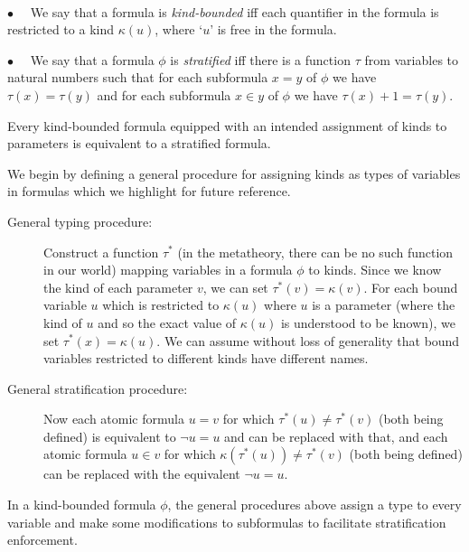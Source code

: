 \documentclass[12pt]{article}
\begin{document}
\begin{dfn} \mbox{}\\
  $\bullet$ \mbox{\, }
  We say that a formula is {\em kind-bounded\/} iff each quantifier in the formula is restricted to a kind $\kappa(u)$, where `$u$' is free in the formula.
  
$\bullet$ \mbox{\, }  We say that a formula $\phi$ is {\em stratified\/} iff there is a function $\tau$ from variables to natural numbers such that for each subformula  $x=y$ of $\phi$ we have $\tau(x)=\tau(y)$ and for each subformula $x \in y$ of $\phi$ we have $\tau(x)+1 = \tau(y)$.\end{dfn}

\begin{thm} Every kind-bounded formula equipped with an intended assignment of kinds to parameters is equivalent to a stratified formula. \end{thm}

\Proof

We begin by defining a general procedure for assigning kinds as types of variables in formulas which we highlight for future reference.

\begin{description}

\item [General typing procedure:]  Construct a function $\tau^*$ (in the metatheory, there can be no such function in our world) mapping variables in a formula $\phi$ to kinds.  Since we know the kind of each parameter $v$, we can set $\tau^*(v) = \kappa(v)$.  For each bound variable $u$ which is restricted to $\kappa(u)$ where
$u$ is a parameter (where the kind of $u$ and so the exact value of $\kappa(u)$ is understood to be known),  we set $\tau^*(x)=\kappa(u)$.  We can assume without loss of generality that bound variables restricted to different kinds have different names. 

\item[General stratification procedure:]

Now each atomic formula $u=v$ for which $\tau^*(u)\neq \tau^*(v)$ (both being defined) is equivalent to $\neg u=u$ and can be replaced with that, and each atomic formula $u \in v$ for which $\kappa(\tau^*(u)) \neq \tau^*(v)$ (both being defined) can be replaced with the equivalent $\neg u=u$. 
\end{description}



In a kind-bounded formula $\phi$, the general procedures above assign a type to every variable and make some modifications to subformulas to facilitate stratification enforcement.
\end{document}
